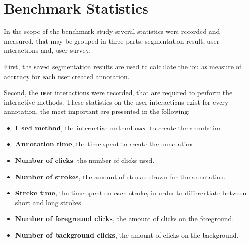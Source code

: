 
\section{Benchmark Statistics}\label{ord:ch4:sec3}

In the scope of the benchmark study several statistics were recorded and measured, that may be grouped in three parts: segmentation result, user interactions and, user survey.

First, the saved segmentation results are used to calculate the \gls{iou} as measure of accuracy for each user created annotation.

Second, the user interactions were recorded, that are required to perform the interactive methods.
These statistics on the user interactions exist for every annotation, the most important are presented in the following:
\begin{itemize}
	\item \textbf{Used method}, the interactive method used to create the annotation.
	\item \textbf{Annotation time}, the time spent to create the annotation.
	\item \textbf{Number of clicks}, the number of clicks used.
	\item \textbf{Number of strokes}, the amount of strokes drawn for the annotation.
	\item \textbf{Stroke time}, the time spent on each stroke, in order to differentiate between short and long strokes.
	\item \textbf{Number of foreground clicks}, the amount of clicks on the foreground.
	\item \textbf{Number of background clicks}, the amount of clicks on the background.
	
	\begin{comment}
	\end{comment}	
\end{itemize}


